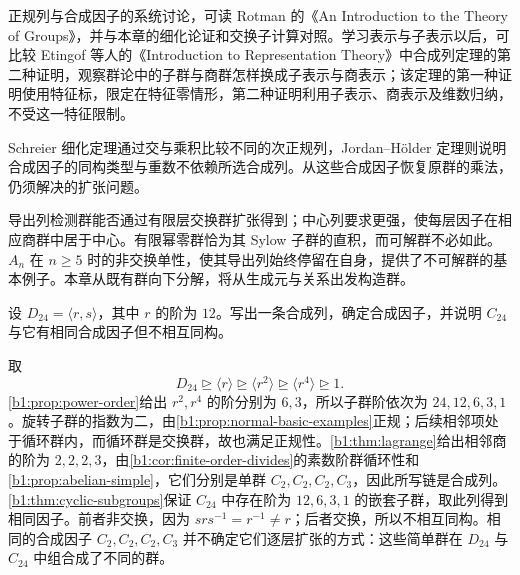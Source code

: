 \ProseParagraphBreak
正规列与合成因子的系统讨论，可读 Rotman 的《An Introduction to the Theory of Groups》\cite[Chapter 5]{Rotman1995TheoryGroups}，并与本章的细化论证和交换子计算对照。学习表示与子表示以后，可比较 Etingof 等人的《Introduction to Representation Theory》\cite[Theorem 3.7.1, second proof, pp. 53--54]{EtingofEtAl2011RepresentationTheory}中合成列定理的第二种证明，观察群论中的子群与商群怎样换成子表示与商表示；该定理的第一种证明使用特征标，限定在特征零情形，第二种证明利用子表示、商表示及维数归纳，不受这一特征限制。






\begin{chaptersummary}
	Schreier 细化定理通过交与乘积比较不同的次正规列，Jordan--Hölder 定理则说明合成因子的同构类型与重数不依赖所选合成列。从这些合成因子恢复原群的乘法，仍须解决的扩张问题。

	\ProseParagraphBreak
	导出列检测群能否通过有限层交换群扩张得到；中心列要求更强，使每层因子在相应商群中居于中心。有限幂零群恰为其 Sylow 子群的直积，而可解群不必如此。\(A_n\) 在 \(n\ge5\) 时的非交换单性，使其导出列始终停留在自身，提供了不可解群的基本例子。本章从既有群向下分解，将从生成元与关系出发构造群。
\end{chaptersummary}

\BookExercises

\begin{exercise}\label{b1:ex:07-composition-dihedral}
	设 \(D_{24}=\langle r,s\rangle\)，其中 \(r\) 的阶为 \(12\)。写出一条合成列，确定合成因子，并说明 \(C_{24}\) 与它有相同合成因子但不相互同构。
\end{exercise}
\begin{solution}
	取
	\[
		D_{24}\trianglerighteq\langle r\rangle \trianglerighteq\langle r^2\rangle \trianglerighteq\langle r^4\rangle\trianglerighteq1.
	\]
	\cref{b1:prop:power-order}给出 \(r^2,r^4\) 的阶分别为 \(6,3\)，所以子群阶依次为 \(24,12,6,3,1\)。旋转子群的指数为二，由\cref{b1:prop:normal-basic-examples}正规；后续相邻项处于循环群内，而循环群是交换群，故也满足正规性。\cref{b1:thm:lagrange}给出相邻商的阶为 \(2,2,2,3\)，由\cref{b1:cor:finite-order-divides}的素数阶群循环性和\cref{b1:prop:abelian-simple}，它们分别是单群 \(C_2,C_2,C_2,C_3\)，因此所写链是合成列。\cref{b1:thm:cyclic-subgroups}保证 \(C_{24}\) 中存在阶为 \(12,6,3,1\) 的嵌套子群，取此列得到相同因子。前者非交换，因为 \(srs^{-1}=r^{-1}\ne r\)；后者交换，所以不相互同构。相同的合成因子 \(C_2,C_2,C_2,C_3\) 并不确定它们逐层扩张的方式：这些简单群在 \(D_{24}\) 与 \(C_{24}\) 中组合成了不同的群。
\end{solution}

